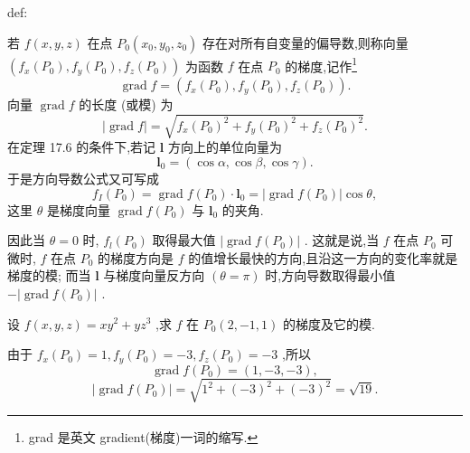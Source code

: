 \begin{definition}{}{def:}

\end{definition}
若 \(f\left( {x,y,z}\right)\) 在点 \({P}_{0}\left( {{x}_{0},{y}_{0},{z}_{0}}\right)\) 存在对所有自变量的偏导数,则称向量 \(\left( {{f}_{x}\left( {P}_{0}\right) ,{f}_{y}\left( {P}_{0}\right) ,{f}_{z}\left( {P}_{0}\right) }\right)\) 为函数 \(f\) 在点 \({P}_{0}\) 的梯度,记作\footnote{grad 是英文 gradient(梯度)一词的缩写.}
\[
\operatorname{grad}f = \left( {{f}_{x}\left( {P}_{0}\right) ,{f}_{y}\left( {P}_{0}\right) ,{f}_{z}\left( {P}_{0}\right) }\right) .
\]
向量 \(\operatorname{grad}f\) 的长度 (或模) 为
\[
\left| {\operatorname{grad}f}\right|  = \sqrt{{f}_{x}{\left( {P}_{0}\right) }^{2} + {f}_{y}{\left( {P}_{0}\right) }^{2} + {f}_{z}{\left( {P}_{0}\right) }^{2}}.
\]
在定理 17.6 的条件下,若记 \(\mathbf{l}\) 方向上的单位向量为
\[
{\mathbf{l}}_{0} = \left( {\cos \alpha ,\cos \beta ,\cos \gamma }\right) .
\]
于是方向导数公式又可写成
\[
{f}_{I}\left( {P}_{0}\right)  = \operatorname{grad}f\left( {P}_{0}\right)  \cdot  {\mathbf{l}}_{0} = \left| {\operatorname{grad}f\left( {P}_{0}\right) }\right| \cos \theta ,
\]
这里 \(\theta\) 是梯度向量 \(\operatorname{grad}f\left( {P}_{0}\right)\) 与 \({\mathbf{l}}_{0}\) 的夹角.

因此当 \(\theta  = 0\) 时, \({f}_{l}\left( {P}_{0}\right)\) 取得最大值 \(\left| {\operatorname{grad}f\left( {P}_{0}\right) }\right|\) . 这就是说,当 \(f\) 在点 \({P}_{0}\) 可微时, \(f\) 在点 \({P}_{0}\) 的梯度方向是 \(f\) 的值增长最快的方向,且沿这一方向的变化率就是梯度的模; 而当 \(\mathbf{l}\) 与梯度向量反方向 \(\left( {\theta  = \pi }\right)\) 时,方向导数取得最小值 \(- \left| {\operatorname{grad}f\left( {P}_{0}\right) }\right|\) .

\begin{example}

\end{example}
设 \(f\left( {x,y,z}\right)  = x{y}^{2} + y{z}^{3}\) ,求 \(f\) 在 \({P}_{0}\left( {2, - 1,1}\right)\) 的梯度及它的模.

\begin{solution}

\end{solution}
由于 \({f}_{x}\left( {P}_{0}\right)  = 1,{f}_{y}\left( {P}_{0}\right)  =  - 3,{f}_{z}\left( {P}_{0}\right)  =  - 3\) ,所以
\[
\operatorname{grad}f\left( {P}_{0}\right)  = \left( {1, - 3, - 3}\right) ,
\]
\[
\left| {\operatorname{grad}f\left( {P}_{0}\right) }\right|  = \sqrt{{1}^{2} + {\left( -3\right) }^{2} + {\left( -3\right) }^{2}} = \sqrt{19}.
\]
